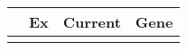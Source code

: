 \begin{tabular}{lccr}
\toprule
{} & Ex & Current & Gene \\
\midrule
{} &    &         &      \\
\bottomrule
\end{tabular}
